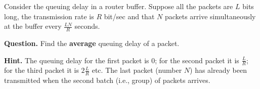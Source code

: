 Consider the queuing delay in a router buffer. Suppose all the packets
are \(L\) bits long, the transmission rate is \(R\) bit/sec and that
\(N\) packets arrive simultaneously at the buffer every
\(\frac{LN}{R}\) seconds.

\textbf{Question.} Find the \textbf{average} queuing delay of a
packet.

\textbf{Hint.} The queuing delay for the first packet is 0; for the
second packet it is \(\frac{L}{R}\); for the third packet it is
\(2{\frac{L}{R}}\) etc. The last packet (number \(N\)) has already
been transmitted when the second batch (i.e., group) of packets
arrives.
